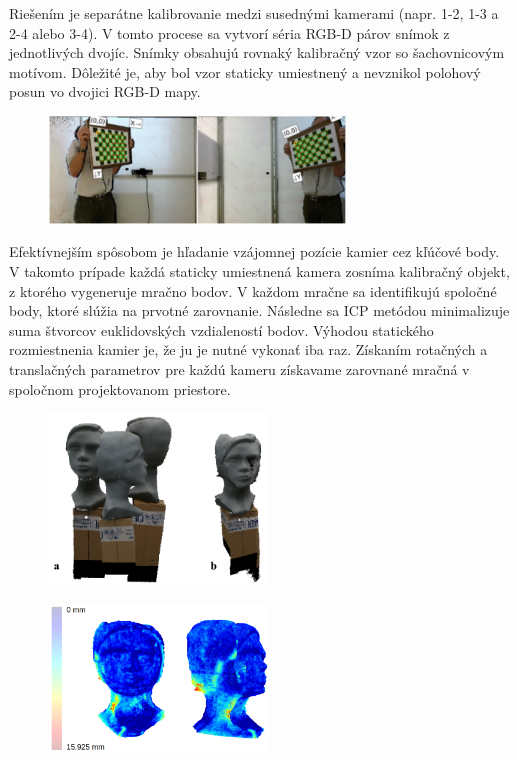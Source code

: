 Riešením je separátne kalibrovanie medzi susednými kamerami (napr. 1-2, 1-3 a 2-4 alebo 3-4). V tomto procese sa vytvorí séria RGB-D párov snímok z jednotlivých dvojíc. Snímky obsahujú rovnaký kalibračný vzor so šachovnicovým motívom. Dôležité je, aby bol vzor staticky umiestnený a nevznikol polohový posun vo dvojici RGB-D mapy. 


\begin{figure}[H]
	\centering
	\includegraphics[width=0.7\textwidth]{figures/calibration_multi_rgbd.jpg}
	\caption{}
	\label{fig:calib:multi:rgbd}
\end{figure}

Efektívnejším spôsobom je hľadanie vzájomnej pozície kamier cez kľúčové body. V takomto prípade každá staticky umiestnená kamera zosníma kalibračný objekt, z ktorého vygeneruje mračno bodov. V každom mračne sa identifikujú spoločné body, ktoré slúžia na prvotné zarovnanie. Následne sa ICP metódou minimalizuje suma štvorcov euklidovských vzdialeností bodov. Výhodou statického rozmiestnenia kamier je, že ju je nutné vykonať iba raz. Získaním rotačných a translačných parametrov pre každú kameru získavame zarovnané mračná v spoločnom projektovanom priestore. 

\begin{figure}[H]
	\centering
	\includegraphics[width=0.52\textwidth]{figures/calibration_multi.jpg}
	\caption{}
	\label{fig:calib:haus:single}
\end{figure}

\begin{figure}[H]
	\centering
	\includegraphics[width=0.52\textwidth]{figures/calibration_hausdorff_multi.jpg}
	\caption{}
	\label{fig:calib:haus:single}
\end{figure}


